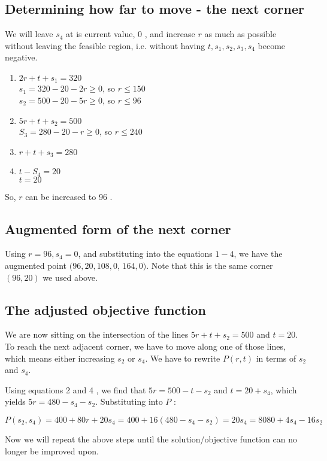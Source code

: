 \subsection*{Determining how far to move - the next corner}
We will leave $s_{4}$ at is current value, 0 , and increase $r$ as much as possible without leaving the feasible region, i.e. without having $t, s_{1}, s_{2}, s_{3}, s_{4}$ become negative.

\begin{enumerate}
  \item $2 r+t+s_{1}=320$\\
$s_{1}=320-20-2 r \geq 0$, so $r \leq 150$\\
$s_{2}=500-20-5 r \geq 0$, so $r \leq 96$
  \item $5 r+t+s_{2}=500$\\
$S_{3}=280-20-r \geq 0$, so $r \leq 240$
  \item $r+t+s_{3}=280$
  \item $t-S_{4}=20$\\
$t=20$
\end{enumerate}
So, $r$ can be increased to 96 .

\subsection*{Augmented form of the next corner}
Using $r=96, s_{4}=0$, and substituting into the equations $1-4$, we have the augmented point $(96,20,108,0$, $164,0)$. Note that this is the same corner $(96,20)$ we used above.

\subsection*{The adjusted objective function}
We are now sitting on the intersection of the lines $5 r+t+s_{2}=500$ and $t=20$. To reach the next adjacent corner, we have to move along one of those lines, which means either increasing $s_{2}$ or $s_{4}$. We have to rewrite $P(r, t)$ in terms of $s_{2}$ and $s_{4}$.

Using equations 2 and 4 , we find that $5 r=500-t-s_{2}$ and $t=20+s_{4}$, which yields $5 r=480-s_{4}-s_{2}$. Substituting into $P$ :

$P\left(s_{2}, s_{4}\right)=400+80 r+20 s_{4}=400+16\left(480-s_{4}-s_{2}\right)=20 s_{4}=8080+4 s_{4}-16 s_{2}$

Now we will repeat the above steps until the solution/objective function can no longer be improved upon.

